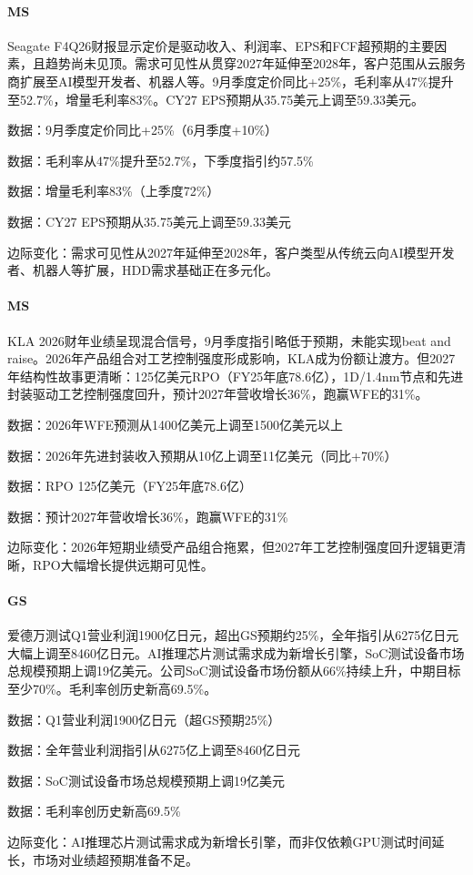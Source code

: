 \documentclass[11pt]{ctexart}
\begin{document}
\paragraph{MS} Seagate F4Q26财报显示定价是驱动收入、利润率、EPS和FCF超预期的主要因素，且趋势尚未见顶。需求可见性从贯穿2027年延伸至2028年，客户范围从云服务商扩展至AI模型开发者、机器人等。9月季度定价同比+25\%，毛利率从47\%提升至52.7\%，增量毛利率83\%。CY27 EPS预期从35.75美元上调至59.33美元。
{\small\color{refgray}数据：9月季度定价同比+25\%（6月季度+10\%）\par}
{\small\color{refgray}数据：毛利率从47\%提升至52.7\%，下季度指引约57.5\%\par}
{\small\color{refgray}数据：增量毛利率83\%（上季度72\%）\par}
{\small\color{refgray}数据：CY27 EPS预期从35.75美元上调至59.33美元\par}
{\small\color{refgray}边际变化：需求可见性从2027年延伸至2028年，客户类型从传统云向AI模型开发者、机器人等扩展，HDD需求基础正在多元化。\par}
\paragraph{MS} KLA 2026财年业绩呈现混合信号，9月季度指引略低于预期，未能实现beat and raise。2026年产品组合对工艺控制强度形成影响，KLA成为份额让渡方。但2027年结构性故事更清晰：125亿美元RPO（FY25年底78.6亿），1D/1.4nm节点和先进封装驱动工艺控制强度回升，预计2027年营收增长36\%，跑赢WFE的31\%。
{\small\color{refgray}数据：2026年WFE预测从1400亿美元上调至1500亿美元以上\par}
{\small\color{refgray}数据：2026年先进封装收入预期从10亿上调至11亿美元（同比+70\%）\par}
{\small\color{refgray}数据：RPO 125亿美元（FY25年底78.6亿）\par}
{\small\color{refgray}数据：预计2027年营收增长36\%，跑赢WFE的31\%\par}
{\small\color{refgray}边际变化：2026年短期业绩受产品组合拖累，但2027年工艺控制强度回升逻辑更清晰，RPO大幅增长提供远期可见性。\par}
\paragraph{GS} 爱德万测试Q1营业利润1900亿日元，超出GS预期约25\%，全年指引从6275亿日元大幅上调至8460亿日元。AI推理芯片测试需求成为新增长引擎，SoC测试设备市场总规模预期上调19亿美元。公司SoC测试设备市场份额从66\%持续上升，中期目标至少70\%。毛利率创历史新高69.5\%。
{\small\color{refgray}数据：Q1营业利润1900亿日元（超GS预期25\%）\par}
{\small\color{refgray}数据：全年营业利润指引从6275亿上调至8460亿日元\par}
{\small\color{refgray}数据：SoC测试设备市场总规模预期上调19亿美元\par}
{\small\color{refgray}数据：毛利率创历史新高69.5\%\par}
{\small\color{refgray}边际变化：AI推理芯片测试需求成为新增长引擎，而非仅依赖GPU测试时间延长，市场对业绩超预期准备不足。\par}
\end{document}
